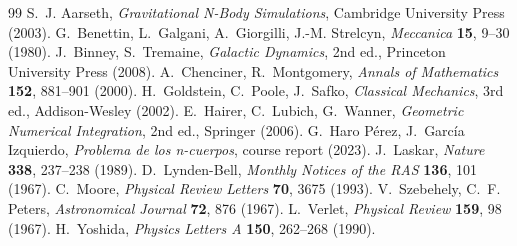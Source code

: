 \documentclass[11pt,a4paper]{article}
\begin{document}
\begin{thebibliography}{99}
\small
{} S.~J. Aarseth, \emph{Gravitational N-Body Simulations}, Cambridge University Press (2003).
 G.~Benettin, L.~Galgani, A.~Giorgilli, J.-M. Strelcyn, \emph{Meccanica} \textbf{15}, 9--30 (1980).
 J.~Binney, S.~Tremaine, \emph{Galactic Dynamics}, 2nd ed., Princeton University Press (2008).
 A.~Chenciner, R.~Montgomery, \emph{Annals of Mathematics} \textbf{152}, 881--901 (2000).
 H.~Goldstein, C.~Poole, J.~Safko, \emph{Classical Mechanics}, 3rd ed., Addison-Wesley (2002).
 E.~Hairer, C.~Lubich, G.~Wanner, \emph{Geometric Numerical Integration}, 2nd ed., Springer (2006).
 G.~Haro Pérez, J.~García Izquierdo, \emph{Problema de los n-cuerpos}, course report (2023).
 J.~Laskar, \emph{Nature} \textbf{338}, 237--238 (1989).
 D.~Lynden-Bell, \emph{Monthly Notices of the RAS} \textbf{136}, 101 (1967).
 C.~Moore, \emph{Physical Review Letters} \textbf{70}, 3675 (1993).
 V.~Szebehely, C.~F. Peters, \emph{Astronomical Journal} \textbf{72}, 876 (1967).
 L.~Verlet, \emph{Physical Review} \textbf{159}, 98 (1967).
 H.~Yoshida, \emph{Physics Letters A} \textbf{150}, 262--268 (1990).
\end{thebibliography}
\end{document}
